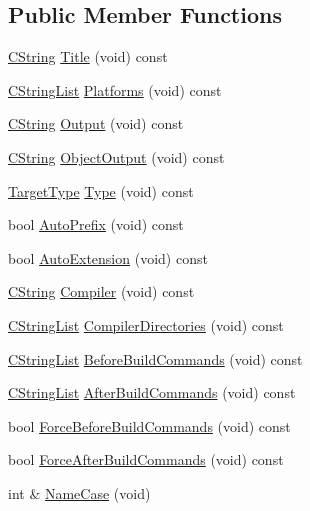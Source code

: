 \subsection*{Public Member Functions}
\begin{DoxyCompactItemize}
\item 
\hyperlink{classCString}{C\-String} \hyperlink{classCBuildTarget_a997ce9f51676fc0af256fb9589801250}{Title} (void) const 
\item 
\hyperlink{classCStringList}{C\-String\-List} \hyperlink{classCBuildTarget_a58751895acaacab3b76e580c1d43a355}{Platforms} (void) const 
\item 
\hyperlink{classCString}{C\-String} \hyperlink{classCBuildTarget_a55dc82877928bf87905a3b2073d2fe31}{Output} (void) const 
\item 
\hyperlink{classCString}{C\-String} \hyperlink{classCBuildTarget_a47d5e653d7bdb868c333e55aa075a937}{Object\-Output} (void) const 
\item 
\hyperlink{classCBuildTarget_ae920f5ba8e1975bafff70b8b30c449b5}{Target\-Type} \hyperlink{classCBuildTarget_a32caa3497047c676e850c3717b3f415b}{Type} (void) const 
\item 
bool \hyperlink{classCBuildTarget_a98a6c0e251b22eb8022cc4527fe48c30}{Auto\-Prefix} (void) const 
\item 
bool \hyperlink{classCBuildTarget_addde823ff741dbb1d264ee2c6096ac61}{Auto\-Extension} (void) const 
\item 
\hyperlink{classCString}{C\-String} \hyperlink{classCBuildTarget_aa98b9abac09952b015ecf64ac7d334f6}{Compiler} (void) const 
\item 
\hyperlink{classCStringList}{C\-String\-List} \hyperlink{classCBuildTarget_a94cce7fd363469cc115167b95605355a}{Compiler\-Directories} (void) const 
\item 
\hyperlink{classCStringList}{C\-String\-List} \hyperlink{classCBuildTarget_a11e8ebc43f32e0af7d887f629a833c9e}{Before\-Build\-Commands} (void) const 
\item 
\hyperlink{classCStringList}{C\-String\-List} \hyperlink{classCBuildTarget_acd09dfbbff2a95ae6a2124e5c925888b}{After\-Build\-Commands} (void) const 
\item 
bool \hyperlink{classCBuildTarget_a1792d9a7d96bbf5cc70168843be26f97}{Force\-Before\-Build\-Commands} (void) const 
\item 
bool \hyperlink{classCBuildTarget_a036630435ab61878316b4025d2588f1b}{Force\-After\-Build\-Commands} (void) const 
\item 
int \& \hyperlink{classCBuildTarget_ab907802acd72029fe1755d2693f4840e}{Name\-Case} (void)

\end{DoxyCompactItemize}
